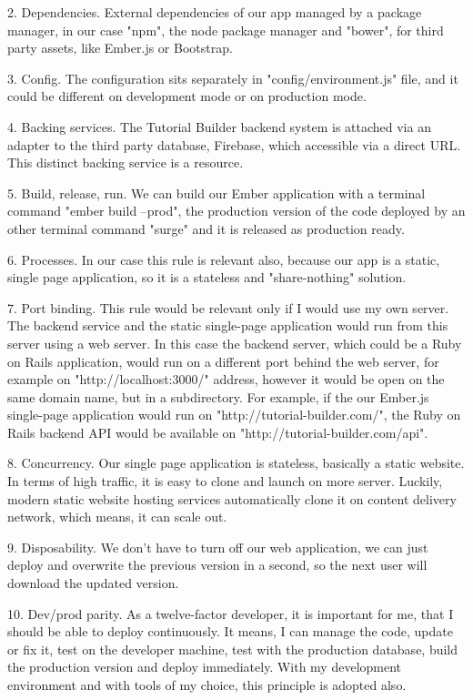 \documentclass[12pt, a4paper, oneside, openright, medskipamount]{report}
\begin{document}
2. Dependencies. External dependencies of our app managed by a package manager, in our case "npm", the node package manager and "bower", for third party assets, like Ember.js or Bootstrap.

3. Config. The configuration sits separately in "config/environment.js" file, and it could be different on development mode or on production mode.

4. Backing services. The Tutorial Builder backend system is attached via an adapter to the third party database, Firebase, which accessible via a direct URL. This distinct backing service is a resource.

5. Build, release, run. We can build our Ember application with a terminal command "ember build --prod", the production version of the code deployed by an other terminal command "surge" and it is released as production ready.

6. Processes. In our case this rule is relevant also, because our app is a static, single page application, so it is a stateless and "share-nothing" solution.

7. Port binding. This rule would be relevant only if I would use my own server. The backend service and the static single-page application would run from this server using a web server. In this case the backend server, which could be a Ruby on Rails application, would run on a different port behind the web server, for example on "http://localhost:3000/" address, however it would be open on the same domain name, but in a subdirectory. For example, if the our Ember.js single-page application would run on "http://tutorial-builder.com/", the Ruby on Rails backend API would be available on "http://tutorial-builder.com/api".

8. Concurrency. Our single page application is stateless, basically a static website. In terms of high traffic, it is easy to clone and launch on more server. Luckily, modern static website hosting services automatically clone it on content delivery network, which means, it can scale out.

9. Disposability. We don't have to turn off our web application, we can just deploy and overwrite the previous version in a second, so the next user will download the updated version.

10. Dev/prod parity. As a twelve-factor developer, it is important for me, that I should be able to deploy continuously. It means, I can manage the code, update or fix it, test on the developer machine, test with the production database, build the production version and deploy immediately. With my development environment and with tools of my choice, this principle is adopted also.
\end{document}
